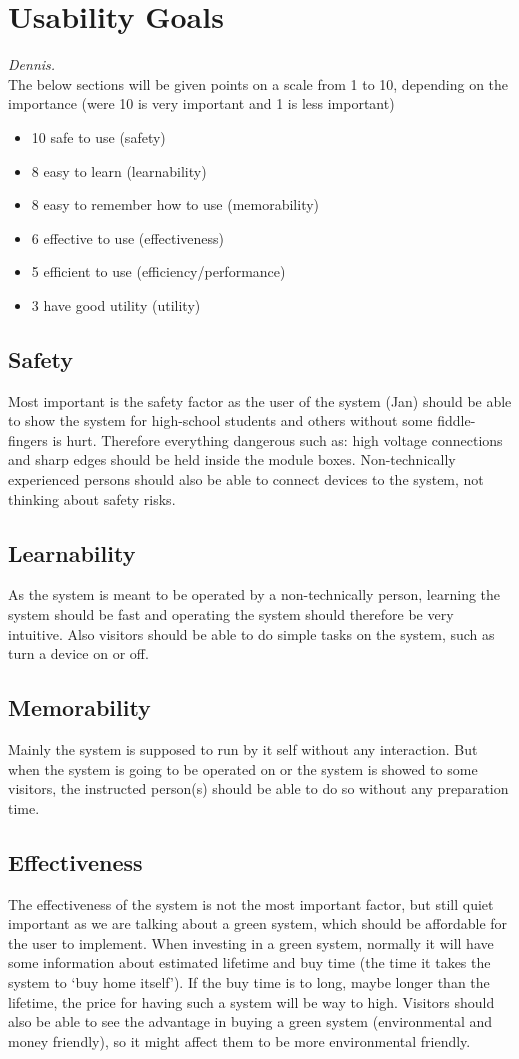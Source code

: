\section{Usability Goals}\textit{Dennis.}\\
The below sections will be given points on a scale from 1 to 10, depending on
the importance (were 10 is very important and 1 is less important)
\begin{itemize}
	\item 10 safe to use (safety)
	\item 8 easy to learn (learnability) 
	\item 8 easy to remember how to use (memorability)
	\item 6 effective to use (effectiveness) 
	\item 5 efficient to use (efficiency/performance)
	\item 3 have good utility (utility)	
\end{itemize}
\subsection{Safety}
Most important is the safety factor as the user of the system (Jan) should be able to show the system for high-school students and others without some fiddle-fingers is hurt. Therefore everything dangerous such as: high voltage connections and sharp edges should be held inside the module boxes.
Non-technically experienced persons should also be able to connect devices to the system, not thinking about safety risks. 
\subsection{Learnability}
As the system is meant to be operated by a non-technically person, learning the system should be fast and operating the system should therefore be very intuitive. 
Also visitors should be able to do simple tasks on the system, such as turn a device on or off.
\subsection{Memorability}
Mainly the system is supposed to run by it self without any interaction. But when the system is going to be operated on or the system is showed to some visitors, the instructed person(s) should be able to do so without any preparation time.
\subsection{Effectiveness}
The effectiveness of the system is not the most important factor, but still quiet important as we are talking about a green system, which should be
affordable for the user to implement. When investing in a green system, normally it will have some information about estimated lifetime and buy time (the time
it takes the system to `buy home itself'). If the buy time is to long, maybe longer than the lifetime, the price for having such a system will be way to high. 
Visitors should also be able to see the advantage in buying a green system (environmental and money friendly), so it might affect them to be more environmental friendly. 
